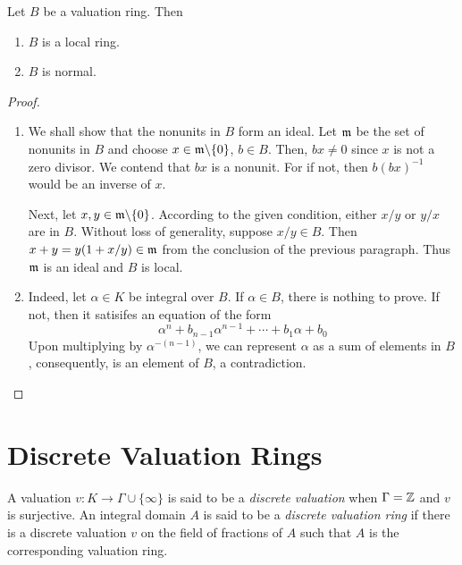 \begin{proposition}
    Let $B$ be a valuation ring. Then 
    \begin{enumerate}[label=(\alph*)]
        \item $B$ is a local ring. 
        \item $B$ is normal.
    \end{enumerate}
\end{proposition}
\begin{proof}
\begin{enumerate}[label=(\alph*)]
    \item We shall show that the nonunits in $B$ form an ideal. Let $\mathfrak m$ be the set of nonunits in $B$ and choose $x\in\mathfrak m\backslash\{0\}$, $b\in B$. Then, $bx\ne 0$ since $x$ is not a zero divisor. We contend that $bx$ is a nonunit. For if not, then $b(bx)^{-1}$ would be an inverse of $x$.

    Next, let $x,y\in\mathfrak m\backslash\{0\}$. According to the given condition, either $x/y$ or $y/x$ are in $B$. Without loss of generality, suppose $x/y\in B$. Then $x + y = y(1 + x/y)\in\mathfrak m$ from the conclusion of the previous paragraph. Thus $\mathfrak m$ is an ideal and $B$ is local.

    \item Indeed, let $\alpha\in K$ be integral over $B$. If $\alpha\in B$, there is nothing to prove. If not, then it satisifes an equation of the form 
    \begin{equation*}
        \alpha^n + b_{n - 1}\alpha^{n - 1} + \cdots + b_1\alpha + b_0
    \end{equation*}
    Upon multiplying by $\alpha^{-(n - 1)}$, we can represent $\alpha$ as a sum of elements in $B$, consequently, is an element of $B$, a contradiction.
\end{enumerate}
\end{proof}


\section{Discrete Valuation Rings}

\begin{definition}
    A valuation $v: K\to\Gamma\cup\{\infty\}$ is said to be a \emph{discrete valuation} when $\Gamma = \mathbb{Z}$ and $v$ is surjective. An integral domain $A$ is said to be a \emph{discrete valuation ring} if there is a discrete valuation $v$ on the field of fractions of $A$ such that $A$ is the corresponding valuation ring.
\end{definition}

